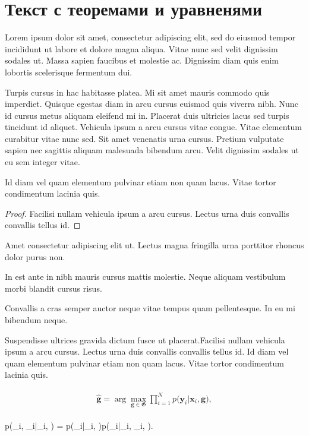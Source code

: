 \chapter{Текст с теоремами и уравненями}
Lorem ipsum dolor sit amet, consectetur adipiscing elit, sed do eiusmod tempor incididunt ut labore et dolore magna aliqua. 
{
Vitae nunc sed velit dignissim sodales ut. Massa sapien faucibus et molestie ac. Dignissim diam quis enim lobortis scelerisque fermentum dui.
}

Turpis cursus in hac habitasse platea. Mi sit amet mauris commodo quis imperdiet. Quisque egestas diam in arcu cursus euismod quis viverra nibh. Nunc id cursus metus aliquam eleifend mi in. Placerat duis ultricies lacus sed turpis tincidunt id aliquet. Vehicula ipsum a arcu cursus vitae congue. Vitae elementum curabitur vitae nunc sed. Sit amet venenatis urna cursus. Pretium vulputate sapien nec sagittis aliquam malesuada bibendum arcu. Velit dignissim sodales ut eu sem integer vitae.

{
Id diam vel quam elementum pulvinar etiam non quam lacus. Vitae tortor condimentum lacinia quis.
}

\begin{proof}
     Facilisi nullam vehicula ipsum a arcu cursus. Lectus urna duis convallis convallis tellus id.
\end{proof}

Amet consectetur adipiscing elit ut. Lectus magna fringilla urna porttitor rhoncus dolor purus non. 

\begin{definition}
    In est ante in nibh mauris cursus mattis molestie. Neque aliquam vestibulum morbi blandit cursus risus.
\end{definition}

\begin{definition}
     Convallis a cras semper auctor neque vitae tempus quam pellentesque. In eu mi bibendum neque. 
\end{definition}

 Suspendisse ultrices gravida dictum fusce ut placerat.Facilisi nullam vehicula ipsum a arcu cursus. Lectus urna duis convallis convallis tellus id. Id diam vel quam elementum pulvinar etiam non quam lacus. Vitae tortor condimentum lacinia quis.

\begin{gather}
\label{ch-2:eq:st:7}
\begin{aligned}
\hat{\mathbf{g}} = \arg\max_{\mathbf{g}\in \mathfrak{G}} \prod_{i=1}^{N}p\bigr(\mathbf{y}_{i}|\mathbf{x}_i, \mathbf{g}\bigr),
\end{aligned}
\end{gather}

{
p\bigr(_i, _i|_i, \bigr) = p\bigr(_i|_i, \bigr)p\bigr(_i|_i, _i, \bigr).
}
